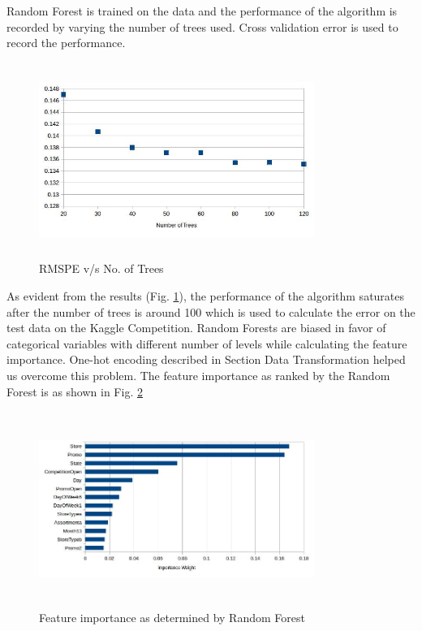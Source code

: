 \documentclass[12pt,a4paper]{article}
\begin{document}
Random Forest is trained on the data and the performance of the algorithm is recorded by varying the number of trees used. Cross validation error is used to record the performance.
\begin{figure}[!htb]
	\centering
	\includegraphics[width=0.8\textwidth, height=2.5in]{images/RF_Error_Plot.jpg}
	\caption{RMSPE v/s No. of Trees}
	\label{fig:rfres}
\end{figure}

As evident from the results (Fig. \ref{fig:rfres}), the performance of the algorithm saturates after the number of trees is around 100 which is used to calculate the error on the test data on the Kaggle Competition.
Random Forests are biased in favor of categorical variables with different number of levels while calculating the feature importance\cite{wiki_rf}. One-hot encoding described in Section Data Transformation  helped us overcome this problem. The feature importance as ranked by the Random Forest is as shown in Fig. \ref{fig:rfimp}

\begin{figure}[H]
	\centering
	\includegraphics[width=0.8\textwidth, height=2.5in]{images/RF_Feature_Importance.jpg}
	\caption{Feature importance as determined by Random Forest}
	\label{fig:rfimp}
\end{figure}
\end{document}
